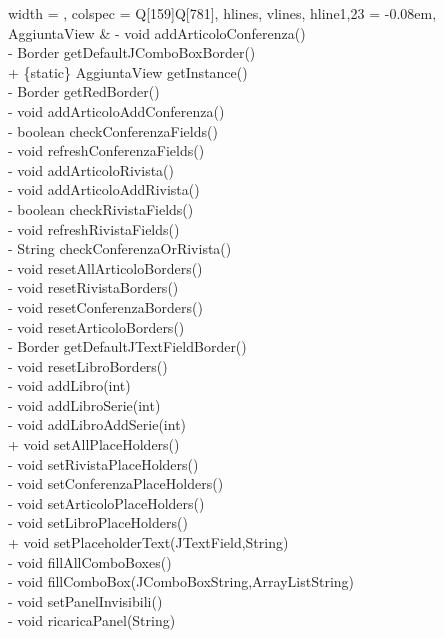\begin{longtblr}[
    label = none,
    entry = none,
  ]{
    width = \linewidth,
    colspec = {Q[159]Q[781]},
    hlines,
    vlines,
    hline{1,23} = {-}{0.08em},
  }
  AggiuntaView           & {- void addArticoloConferenza()\\- Border getDefaultJComboBoxBorder()\\+ \{static\} AggiuntaView getInstance()\\- Border getRedBorder()\\- void addArticoloAddConferenza()\\- boolean checkConferenzaFields()\\- void refreshConferenzaFields()\\- void addArticoloRivista()\\- void addArticoloAddRivista()\\- boolean checkRivistaFields()\\- void refreshRivistaFields()\\- String checkConferenzaOrRivista()\\- void resetAllArticoloBorders()\\- void resetRivistaBorders()\\- void resetConferenzaBorders()\\- void resetArticoloBorders()\\- Border getDefaultJTextFieldBorder()\\- void resetLibroBorders()\\- void addLibro(int)\\- void addLibroSerie(int)\\- void addLibroAddSerie(int)\\+ void setAllPlaceHolders()\\- void setRivistaPlaceHolders()\\- void setConferenzaPlaceHolders()\\- void setArticoloPlaceHolders()\\- void setLibroPlaceHolders()\\+ void setPlaceholderText(JTextField,String)\\- void fillAllComboBoxes()\\- void fillComboBox(JComboBoxString,ArrayListString)\\- void setPanelInvisibili()\\- void ricaricaPanel(String)}                                                                                                                                                                                                                                                                                                                                                                                                                                                                                                                                                                                                                                                                                                                                                                                                                               \\

\end{longtblr}
